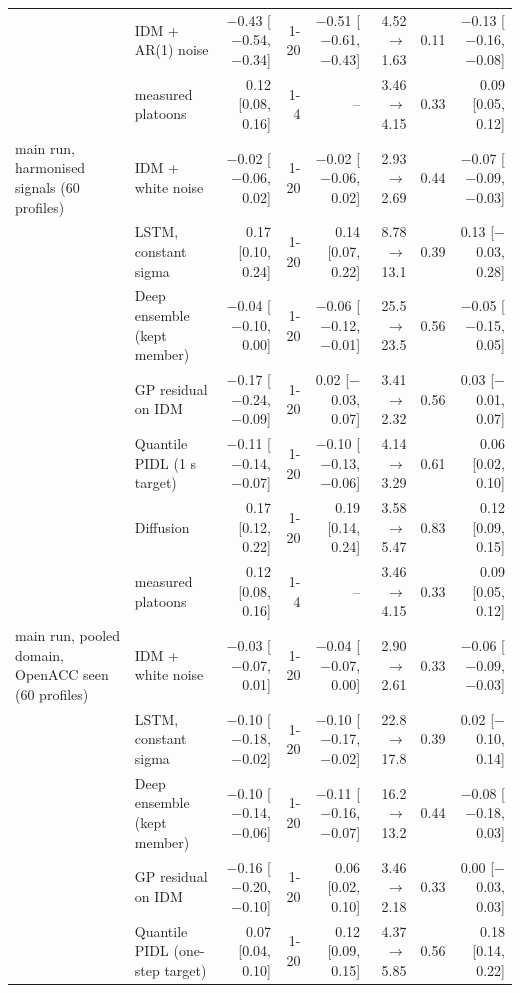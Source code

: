 \begin{longtable}{llrrrrrr}
 & IDM + AR(1) noise & $-$0.43 [$-$0.54, $-$0.34] & 1-20 & $-$0.51 [$-$0.61, $-$0.43] & 4.52 $\rightarrow$ 1.63 & 0.11 & $-$0.13 [$-$0.16, $-$0.08] \\
 & measured platoons & 0.12 [0.08, 0.16] & 1-4 & -- & 3.46 $\rightarrow$ 4.15 & 0.33 & 0.09 [0.05, 0.12] \\
\midrule
main run, harmonised signals (60 profiles) & IDM + white noise & $-$0.02 [$-$0.06, 0.02] & 1-20 & $-$0.02 [$-$0.06, 0.02] & 2.93 $\rightarrow$ 2.69 & 0.44 & $-$0.07 [$-$0.09, $-$0.03] \\
 & LSTM, constant sigma & 0.17 [0.10, 0.24] & 1-20 & 0.14 [0.07, 0.22] & 8.78 $\rightarrow$ 13.1 & 0.39 & 0.13 [$-$0.03, 0.28] \\
 & Deep ensemble (kept member) & $-$0.04 [$-$0.10, 0.00] & 1-20 & $-$0.06 [$-$0.12, $-$0.01] & 25.5 $\rightarrow$ 23.5 & 0.56 & $-$0.05 [$-$0.15, 0.05] \\
 & GP residual on IDM & $-$0.17 [$-$0.24, $-$0.09] & 1-20 & 0.02 [$-$0.03, 0.07] & 3.41 $\rightarrow$ 2.32 & 0.56 & 0.03 [$-$0.01, 0.07] \\
 & Quantile PIDL (1 s target) & $-$0.11 [$-$0.14, $-$0.07] & 1-20 & $-$0.10 [$-$0.13, $-$0.06] & 4.14 $\rightarrow$ 3.29 & 0.61 & 0.06 [0.02, 0.10] \\
 & Diffusion & 0.17 [0.12, 0.22] & 1-20 & 0.19 [0.14, 0.24] & 3.58 $\rightarrow$ 5.47 & 0.83 & 0.12 [0.09, 0.15] \\
 & measured platoons & 0.12 [0.08, 0.16] & 1-4 & -- & 3.46 $\rightarrow$ 4.15 & 0.33 & 0.09 [0.05, 0.12] \\
\midrule
main run, pooled domain, OpenACC seen (60 profiles) & IDM + white noise & $-$0.03 [$-$0.07, 0.01] & 1-20 & $-$0.04 [$-$0.07, 0.00] & 2.90 $\rightarrow$ 2.61 & 0.33 & $-$0.06 [$-$0.09, $-$0.03] \\
 & LSTM, constant sigma & $-$0.10 [$-$0.18, $-$0.02] & 1-20 & $-$0.10 [$-$0.17, $-$0.02] & 22.8 $\rightarrow$ 17.8 & 0.39 & 0.02 [$-$0.10, 0.14] \\
 & Deep ensemble (kept member) & $-$0.10 [$-$0.14, $-$0.06] & 1-20 & $-$0.11 [$-$0.16, $-$0.07] & 16.2 $\rightarrow$ 13.2 & 0.44 & $-$0.08 [$-$0.18, 0.03] \\
 & GP residual on IDM & $-$0.16 [$-$0.20, $-$0.10] & 1-20 & 0.06 [0.02, 0.10] & 3.46 $\rightarrow$ 2.18 & 0.33 & 0.00 [$-$0.03, 0.03] \\
 & Quantile PIDL (one-step target) & 0.07 [0.04, 0.10] & 1-20 & 0.12 [0.09, 0.15] & 4.37 $\rightarrow$ 5.85 & 0.56 & 0.18 [0.14, 0.22] \\

\end{longtable}
